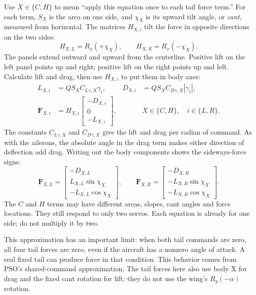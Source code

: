 \documentclass[11pt,a4paper]{article}
\numberwithin{equation}{section}
\newcommand{\vect}[1]{\boldsymbol{#1}}
\begin{document}
Use $X\in\{C,H\}$ to mean ``apply this equation once to each tail force
term.'' For each term, $S_X$ is the area on one side, and $\chi_X$ is its
upward tilt angle, or \emph{cant}, measured from horizontal.
The matrices $H_{X,i}$ tilt the force in opposite directions on the two sides:
\begin{equation}\label{eq:tail-rotation}
 H_{X,L}=R_x(+\chi_X),\qquad H_{X,R}=R_x(-\chi_X).
\end{equation}
The panels extend outward and upward from the centerline. Positive lift on
the left panel points up and right; positive lift on the right points up
and left. Calculate lift and drag, then use $H_{X,i}$ to put them in body axes:
\begin{align}
 L_{X,i}&=QS_X C_{L\gamma,X}\gamma_i,&
 D_{X,i}&=QS_X C_{D\gamma,X}|\gamma_i|,\label{eq:tail-mag}\\
 \vect F_{X,i}&=H_{X,i}
 \begin{bmatrix}-D_{X,i}\\0\\-L_{X,i}\end{bmatrix},&&
 X\in\{C,H\},\quad i\in\{L,R\}.\label{eq:tail-force}
\end{align}
The constants $C_{L\gamma,X}$ and $C_{D\gamma,X}$ give the lift and drag
per radian of command. As with the ailerons, the absolute angle in the drag
term makes either direction of deflection add drag.
Writing out the body components shows the sideways-force signs:
\begin{equation}
 \vect F_{X,L}=\begin{bmatrix}
 -D_{X,L}\\ L_{X,L}\sin\chi_X\\-L_{X,L}\cos\chi_X
 \end{bmatrix},\qquad
 \vect F_{X,R}=\begin{bmatrix}
 -D_{X,R}\\-L_{X,R}\sin\chi_X\\-L_{X,R}\cos\chi_X
 \end{bmatrix}.
\end{equation}
The $C$ and $H$ terms may have different areas, slopes, cant angles and
force locations. They still respond to only two servos. Each equation is
already for one side; do not multiply it by two.

This approximation has an important limit: when both tail commands are
zero, all four tail forces are zero, even if the aircraft has a nonzero
angle of attack. A real fixed tail can produce force in that condition.
This behavior comes from PSO's shared-command approximation. The tail
forces here also use body X for drag and the fixed cant rotation for lift;
they do not use the wing's $R_y(-\alpha)$ rotation.
\end{document}

